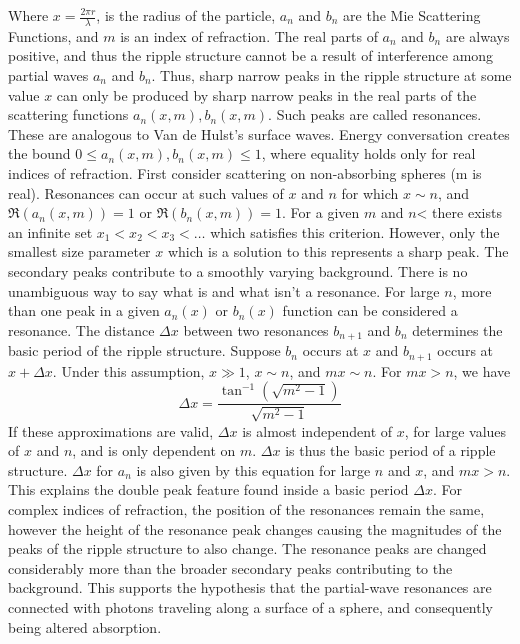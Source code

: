 \documentclass[oneside]{book}
\theoremstyle{mystyle}
\begin{document}
\noindent Where $x = \frac{2\pi r}{\lambda}$, is the radius of the particle, $a_n$ and $b_n$ are the Mie Scattering Functions, and $m$ is an index of refraction. The real parts of $a_n$ and $b_n$ are always positive, and thus the ripple structure cannot be a result of interference among partial waves $a_n$ and $b_n$. Thus, sharp narrow peaks in the ripple structure at some value $x$ can only be produced by sharp narrow peaks in the real parts of the scattering functions $a_{n}(x,m), b_{n}(x,m)$. Such peaks are called resonances. These are analogous to Van de Hulst's surface waves. Energy conversation creates the bound $0 \leq a_{n}(x,m), b_{n}(x,m) \leq 1$, where equality holds only for real indices of refraction. First consider scattering on non-absorbing spheres (m is real). Resonances can occur at such values of $x$ and $n$ for which $x \sim n$, and $\Re(a_{n}(x,m)) = 1$ or $\Re(b_{n}(x,m)) = 1$. For a given $m$ and $n$< there exists an infinite set $x_1< x_2 <x_3 <\hdots$ which satisfies this criterion. However, only the smallest size parameter $x$ which is a solution to this represents a sharp peak. The secondary peaks contribute to a smoothly varying background. There is no unambiguous way to say what is and what isn't a resonance. For large $n$, more than one peak in a given $a_{n}(x)$ or $b_{n}(x)$ function can be considered a resonance. The distance $\Delta x$ between two resonances $b_{n+1}$ and $b_{n}$ determines the basic period of the ripple structure. Suppose $b_n$ occurs at $x$ and $b_{n+1}$ occurs at $x+\Delta x$. Under this assumption, $x\gg 1$, $x\sim n$, and $mx\sim n$. For $mx>n$, we have
\begin{equation}
\Delta x =\frac{\tan^{-1}(\sqrt{m^2-1})}{\sqrt{m^2-1}}
\end{equation}
\noindent If these approximations are valid, $\Delta x$ is almost independent of $x$, for large values of $x$ and $n$, and is only dependent on $m$. $\Delta x$ is thus the basic period of a ripple structure. $\Delta x$ for $a_{n}$ is also given by this equation for large $n$ and $x$, and $mx>n$. This explains the double peak feature found inside a basic period $\Delta x$. For complex indices of refraction, the position of the resonances remain the same, however the height of the resonance peak changes causing the magnitudes of the peaks of the ripple structure to also change. The resonance peaks are changed considerably more than the broader secondary peaks contributing to the background. This supports the hypothesis that the partial-wave resonances are connected with photons traveling along a surface of a sphere, and consequently being altered absorption. 
\end{document}
